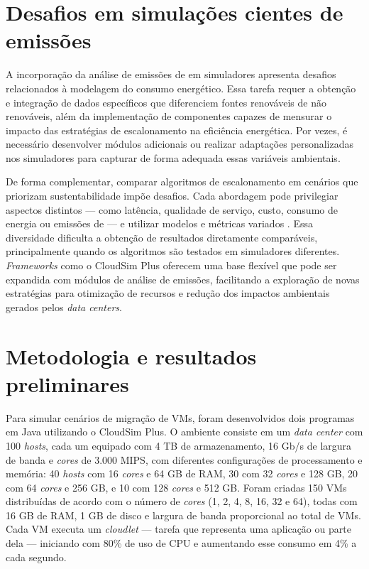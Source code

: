 \documentclass[12pt]{article}
\begin{document}
\section{Desafios em simulações cientes de emissões}

A incorporação da análise de emissões de  em simuladores apresenta desafios relacionados à modelagem do consumo energético. Essa tarefa requer a obtenção e integração de dados específicos que diferenciem fontes renováveis de não renováveis, além da implementação de componentes capazes de mensurar o impacto das estratégias de escalonamento na eficiência energética. Por vezes, é necessário desenvolver módulos adicionais ou realizar adaptações personalizadas nos simuladores para capturar de forma adequada essas variáveis ambientais.

De forma complementar, comparar algoritmos de escalonamento em cenários que priorizam sustentabilidade impõe desafios. Cada abordagem pode privilegiar aspectos distintos --- como latência, qualidade de serviço, custo, consumo de energia ou emissões de  --- e utilizar modelos e métricas variados \cite{kumar:19}. Essa diversidade dificulta a obtenção de resultados diretamente comparáveis, principalmente quando os algoritmos são testados em simuladores diferentes. \textit{Frameworks} como o CloudSim Plus \cite{silva:17} oferecem uma base flexível que pode ser expandida com módulos de análise de emissões, facilitando a exploração de novas estratégias para otimização de recursos e redução dos impactos ambientais gerados pelos \textit{data centers}.

\section{Metodologia e resultados preliminares}

Para simular cenários de migração de VMs, foram desenvolvidos dois programas em Java utilizando o CloudSim Plus. O ambiente consiste em um \textit{data center} com 100 \textit{hosts}, cada um equipado com 4 TB de armazenamento, 16 Gb/s de largura de banda e \textit{cores} de 3.000 MIPS, com diferentes configurações de processamento e memória: 40 \textit{hosts} com 16 \textit{cores} e 64 GB de RAM, 30 com 32 \textit{cores} e 128 GB, 20 com 64 \textit{cores} e 256 GB, e 10 com 128 \textit{cores} e 512 GB. Foram criadas 150 VMs distribuídas de acordo com o número de \textit{cores} (1, 2, 4, 8, 16, 32 e 64), todas com 16 GB de RAM, 1 GB de disco e largura de banda proporcional ao total de VMs. Cada VM executa um \textit{cloudlet} --- tarefa que representa uma aplicação ou parte dela --- iniciando com 80\% de uso de CPU e aumentando esse consumo em 4\% a cada segundo.
\end{document}
